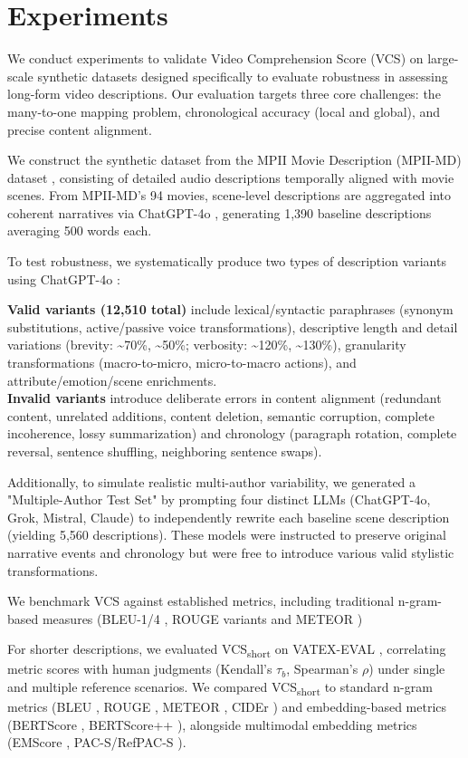\section{Experiments}
We conduct experiments to validate Video Comprehension Score (VCS) on large-scale synthetic datasets designed specifically to evaluate robustness in assessing long-form video descriptions. Our evaluation targets three core challenges: the many-to-one mapping problem, chronological accuracy (local and global), and precise content alignment.

We construct the synthetic dataset from the MPII Movie Description (MPII-MD) dataset \cite{rohrbach2015dataset}, consisting of detailed audio descriptions temporally aligned with movie scenes. From MPII-MD's 94 movies, scene-level descriptions are aggregated into coherent narratives via ChatGPT-4o \cite{achiam2023gpt}, generating 1,390 baseline descriptions averaging 500 words each.

To test robustness, we systematically produce two types of description variants using ChatGPT-4o \cite{achiam2023gpt}:

\textbf{Valid variants (12,510 total)} include lexical/syntactic paraphrases (synonym substitutions, active/passive voice transformations), descriptive length and detail variations (brevity: \textasciitilde70\%, \textasciitilde50\%; verbosity: \textasciitilde120\%, \textasciitilde130\%), granularity transformations (macro-to-micro, micro-to-macro actions), and attribute/emotion/scene enrichments.\\
\textbf{Invalid variants} introduce deliberate errors in content alignment (redundant content, unrelated additions, content deletion, semantic corruption, complete incoherence, lossy summarization) and chronology (paragraph rotation, complete reversal, sentence shuffling, neighboring sentence swaps).


Additionally, to simulate realistic multi-author variability, we generated a "Multiple-Author Test Set" by prompting four distinct LLMs (ChatGPT-4o, Grok, Mistral, Claude) to independently rewrite each baseline scene description (yielding 5,560 descriptions). These models were instructed to preserve original narrative events and chronology but were free to introduce various valid stylistic transformations.

We benchmark VCS against established metrics, including traditional n-gram-based measures (BLEU-1/4 \cite{papineni2002bleu}, ROUGE \cite{lin2004rouge} variants and METEOR \cite{banerjee2005meteor}) 

For shorter descriptions, we evaluated VCS\textsubscript{short} on VATEX-EVAL \cite{shi2022emscore}, correlating metric scores with human judgments (Kendall's $\tau_b$, Spearman's $\rho$) under single and multiple reference scenarios. We compared VCS\textsubscript{short} to standard n-gram metrics (BLEU \cite{papineni2002bleu}, ROUGE \cite{lin2004rouge}, METEOR \cite{banerjee2005meteor}, CIDEr \cite{vedantam2015cider}) and embedding-based metrics (BERTScore \cite{zhang2019bertscore}, BERTScore++ \cite{yi2020improving}), alongside multimodal embedding metrics (EMScore \cite{shi2022emscore}, PAC-S/RefPAC-S \cite{sarto2023positive}).